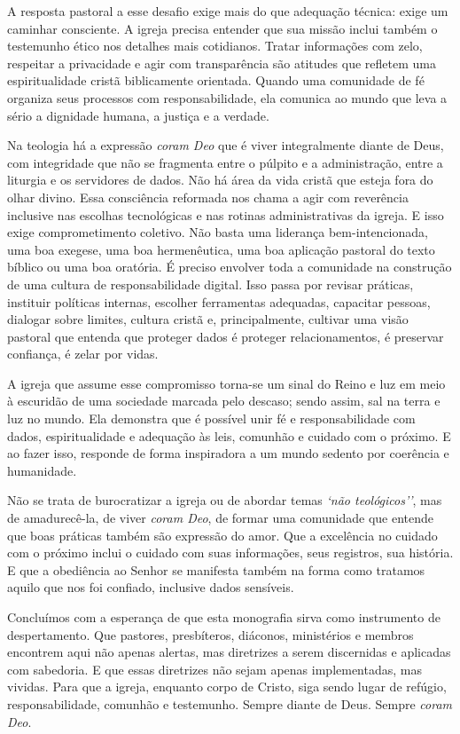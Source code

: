 A resposta pastoral a esse desafio exige mais do que adequação técnica: exige um caminhar consciente. A igreja precisa entender que sua missão inclui também o testemunho ético nos detalhes mais cotidianos. Tratar informações com zelo, respeitar a privacidade e agir com transparência são atitudes que refletem uma espiritualidade cristã biblicamente orientada. Quando uma comunidade de fé organiza seus processos com responsabilidade, ela comunica ao mundo que leva a sério a dignidade humana, a justiça e a verdade.

Na teologia há a expressão \textit{coram Deo} que é viver integralmente diante de Deus, com integridade que não se fragmenta entre o púlpito e a administração, entre a liturgia e os servidores de dados. Não há área da vida cristã que esteja fora do olhar divino. Essa consciência reformada nos chama a agir com reverência inclusive nas escolhas tecnológicas e nas rotinas administrativas da igreja. E isso exige comprometimento coletivo. Não basta uma liderança bem-intencionada, uma boa exegese, uma boa hermenêutica, uma boa aplicação pastoral do texto bíblico ou uma boa oratória. É preciso envolver toda a comunidade na construção de uma cultura de responsabilidade digital. Isso passa por revisar práticas, instituir políticas internas, escolher ferramentas adequadas, capacitar pessoas, dialogar sobre limites, cultura cristã e, principalmente, cultivar uma visão pastoral que entenda que proteger dados é proteger relacionamentos, é preservar confiança, é zelar por vidas.

A igreja que assume esse compromisso torna-se um sinal do Reino e luz em meio à escuridão de uma sociedade marcada pelo descaso; sendo assim, sal na terra e luz no mundo. Ela demonstra que é possível unir fé e responsabilidade com dados, espiritualidade e adequação às leis, comunhão e cuidado com o próximo. E ao fazer isso, responde de forma inspiradora a um mundo sedento por coerência e humanidade.

Não se trata de burocratizar a igreja ou de abordar temas \textit{`não teológicos''}, mas de amadurecê-la, de viver \textit{coram Deo}, de formar uma comunidade que entende que boas práticas também são expressão do amor. Que a excelência no cuidado com o próximo inclui o cuidado com suas informações, seus registros, sua história. E que a obediência ao Senhor se manifesta também na forma como tratamos aquilo que nos foi confiado, inclusive dados sensíveis.

Concluímos com a esperança de que esta monografia sirva como instrumento de despertamento. Que pastores, presbíteros, diáconos, ministérios e membros encontrem aqui não apenas alertas, mas diretrizes a serem discernidas e aplicadas com sabedoria. E que essas diretrizes não sejam apenas implementadas, mas vividas. Para que a igreja, enquanto corpo de Cristo, siga sendo lugar de refúgio, responsabilidade, comunhão e testemunho. Sempre diante de Deus. Sempre \textit{coram Deo}.